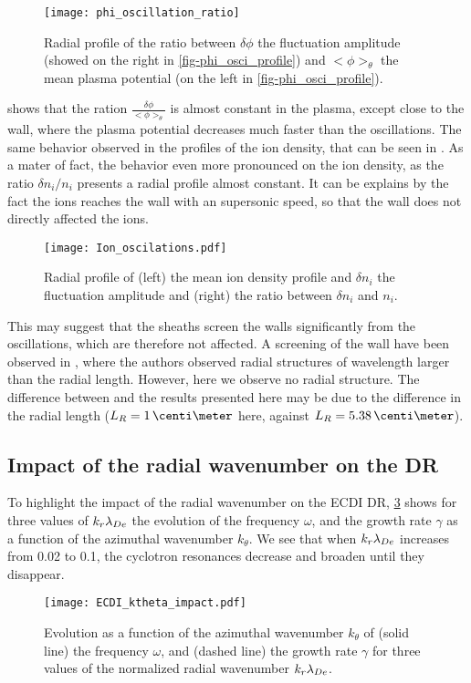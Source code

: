   \begin{figure}[hbt]
    \centering
    \texttt{[image: phi\_oscillation\_ratio]}
    \caption{Radial profile of the ratio between $\delta \phi$ the fluctuation amplitude (showed on the right in \cref{fig-phi_osci_profile}) and $<\phi>_{\theta}$  the mean plasma potential (on the left in \cref{fig-phi_osci_profile}).}
    \label{fig-ratio}
  \end{figure}
  
   shows that the ration $\frac{\delta \phi}{ <\phi>_{\theta}}$ is almost constant in the plasma, except close to the wall, where the plasma potential decreases much faster than the oscillations.
  The same behavior  observed in the profiles of the ion density, that can be seen in .
  As a mater of fact, the behavior even more pronounced on the ion density, as the ratio $\delta n_i / n_i$ presents a radial profile almost constant.
  It can be explains by the fact the ions reaches the wall with an supersonic speed, so that the wall does not directly affected the ions.
  
  
  \begin{figure}[hbt]
    \centering
    \texttt{[image: Ion\_oscilations.pdf]}
    \caption{Radial profile of (left) the mean ion density profile and $\delta n_i$ the fluctuation amplitude and (right) the ratio between $\delta n_i$ and $n_i$.}
    \label{fig-ion_oscilation}
  \end{figure}
  
  \vspace{1em}
  This may suggest that the sheaths screen  the walls significantly from the oscillations,  which are therefore not affected.
  A screening of the wall have been observed in \citet{janhunen2018}, where the authors observed radial structures of wavelength larger than the radial length.
  However, here we observe no radial structure.
  The difference between  \citet{janhunen2018} and the results presented here may be due to the difference in the radial length ($L_R =1 \,\centi\meter$ here, against $L_R = 5.38\,\centi\meter$).
  
  \subsection{Impact of the radial wavenumber on the \ac{DR}}
   \label{subsec-kr}

  To highlight the impact of the radial wavenumber on the \ac{ECDI} \ac{DR}, \cref{fig-kreffect} shows for three values of $k_r \lambda_{De}$ the evolution of the frequency $\omega$, and  the growth rate $\gamma$ as a function of the azimuthal wavenumber $k_{\theta}$.
  We see that when $k_r \lambda_{De}$ increases from 0.02 to 0.1, the cyclotron resonances decrease and broaden until they disappear.
  \begin{figure}[!hbt]
    \centering
    \texttt{[image: ECDI\_ktheta\_impact.pdf]}
    \caption{Evolution as a function of the azimuthal wavenumber $k_{\theta}$ of (solid line) the frequency $\omega$, and (dashed line) the growth rate $\gamma$ for three values of the normalized radial wavenumber $k_r \lambda_{De}$. }
    \label{fig-kreffect}
  \end{figure}
  
